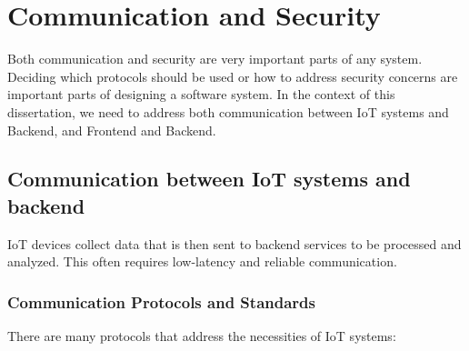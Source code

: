 \section{Communication and Security}
Both communication and security are very important parts of any system.
Deciding which protocols should be used or how to address security concerns are
important parts of designing a software system. In the context of this
dissertation, we need to address both communication between IoT systems and
Backend, and Frontend and Backend.


\subsection{Communication between IoT systems and backend}
IoT devices collect data that is then sent to backend services to be processed
and analyzed. This often requires low-latency and reliable communication.
\subsubsection{Communication Protocols and Standards}
There are many protocols that address the necessities of IoT systems:

